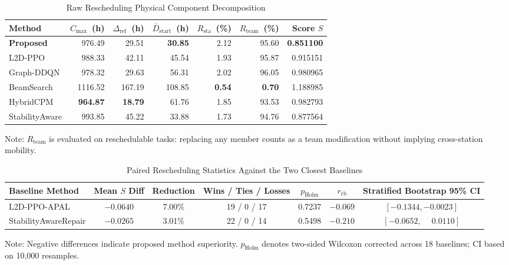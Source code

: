 \documentclass[journal,10pt]{IEEEtran}
\renewcommand{\arraystretch}{1.04}
\begin{document}
\begin{table}[!t]
\centering
\caption{Raw Rescheduling Physical Component Decomposition}
\label{tab:raw_components}
\setlength{\tabcolsep}{3pt}
\renewcommand{\arraystretch}{0.98}
\begin{adjustbox}{max width=\columnwidth}
\begin{tabular}{@{}lrrrrrr@{}}
\toprule
\textbf{Method} & $C_{\max}$~(h) & $\Delta_{\mathrm{ref}}$~(h) & $\bar D_{\mathrm{start}}$~(h) & $R_{\mathrm{sta}}$~(\%) & $R_{\mathrm{team}}$~(\%) & \textbf{Score} $S$ \\
\midrule
\textbf{Proposed} & 976.49 & 29.51 & \textbf{30.85} & 2.12 & 95.60 & \textbf{0.851100} \\
L2D-PPO & 988.33 & 42.11 & 45.54 & 1.93 & 95.87 & 0.915151 \\
Graph-DDQN & 978.32 & 29.63 & 56.31 & 2.02 & 96.05 & 0.980965 \\
BeamSearch & 1116.52 & 167.19 & 108.85 & \textbf{0.54} & \textbf{0.70} & 1.188985 \\
HybridCPM & \textbf{964.87} & \textbf{18.79} & 61.76 & 1.85 & 93.53 & 0.982793 \\
StabilityAware & 993.85 & 45.22 & 33.88 & 1.73 & 94.76 & 0.877564 \\
\bottomrule
\end{tabular}
\end{adjustbox}
\par\smallskip
{\footnotesize Note: $R_{\mathrm{team}}$ is evaluated on reschedulable tasks: replacing any member counts as a team modification without implying cross-station mobility.}
\end{table}

\begin{table}[!t]
\centering
\caption{Paired Rescheduling Statistics Against the Two Closest Baselines}
\label{tab:paired_stats}
\setlength{\tabcolsep}{6pt}
\renewcommand{\arraystretch}{1.06}
\begin{adjustbox}{max width=\textwidth}
\begin{tabular}{@{}lcccccc@{}}
\toprule
\textbf{Baseline Method} & \textbf{Mean $S$ Diff} & \textbf{Reduction} & \textbf{Wins / Ties / Losses} & $p_{\mathrm{Holm}}$ & $r_{\mathrm{rb}}$ & \textbf{Stratified Bootstrap 95\% CI} \\
\midrule
L2D-PPO-APAL & $-0.0640$ & 7.00\% & 19 / 0 / 17 & 0.7237 & $-0.069$ & $[-0.1344, -0.0023]$ \\
StabilityAwareRepair & $-0.0265$ & 3.01\% & 22 / 0 / 14 & 0.5498 & $-0.210$ & $[-0.0652, \phantom{-}0.0110]$ \\
\bottomrule
\end{tabular}
\end{adjustbox}
\par\smallskip
{\footnotesize Note: Negative differences indicate proposed method superiority. $p_{\mathrm{Holm}}$ denotes two-sided Wilcoxon corrected across 18 baselines; CI based on 10,000 resamples.}
\end{table}
\end{document}
